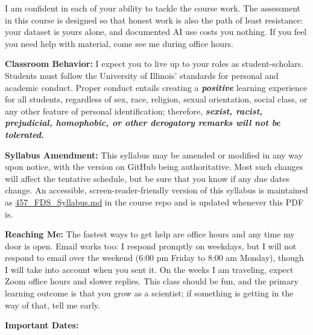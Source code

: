 I am confident in each of your ability to tackle the course work. The
assessment in this course is designed so that honest work is also the path of
least resistance: your dataset is yours alone, and documented AI use costs you nothing. If
you feel you need help with material, come see me during office hours.
\medskip

{\bf \headerfont \color{RoyalBlue} Classroom Behavior:}
I expect you to live up to your roles as student-scholars. Students must follow
the University of Illinois' standards for personal and academic conduct.
Proper conduct entails creating a \emph{\bf \color{ForestGreen}positive}
learning experience for all students, regardless of sex, race, religion, sexual
orientation, social class, or any other feature of personal identification;
therefore, \emph{\bf \color{Red} sexist, racist, prejudicial, homophobic, or
other derogatory remarks will not be tolerated.}
\medskip

{\bf \headerfont \color{RoyalBlue} Syllabus Amendment:}
This syllabus may be amended or modified in any way upon notice, with the
version on GitHub being authoritative. Most such changes will affect the
tentative schedule, but be sure that you know if any due dates change.
An accessible, screen-reader-friendly version of this syllabus is maintained
as \href{https://github.com/gnarayan/ast457_2026_Fall/blob/main/457_FDS_Syllabus.md}{457\_FDS\_Syllabus.md}
in the course repo and is updated whenever this PDF is.
\medskip

{\bf \headerfont \color{RoyalBlue} Reaching Me:}
The fastest ways to get help are office hours and any time my door is open.
Email works too: I respond promptly on weekdays, but I will not respond to
email over the weekend (6:00 pm Friday to 8:00 am Monday), though I will take
into account when you sent it. On the weeks I am traveling, expect Zoom office
hours and slower replies. This class should be fun, and the primary learning
outcome is that you grow as a scientist; if something is getting in the way of
that, tell me early.
\medskip

{\bf \headerfont \color{RoyalBlue} Important Dates:}

